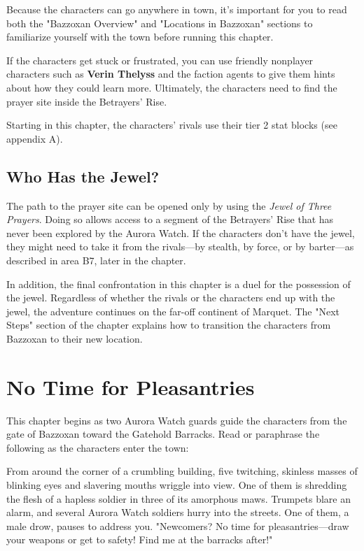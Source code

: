 \documentclass[10pt,a4paper,twoside,bg=print,twocolumn,openany,nodeprecatedcode]{dndbook}
\begin{document}
Because the characters can go anywhere in town, it's important for you to read both the "Bazzoxan Overview" and "Locations in Bazzoxan" sections to familiarize yourself with the town before running this chapter.

If the characters get stuck or frustrated, you can use friendly nonplayer characters such as \textbf{Verin Thelyss} and the faction agents to give them hints about how they could learn more. Ultimately, the characters need to find the prayer site inside the Betrayers' Rise.

Starting in this chapter, the characters' rivals use their tier 2 stat blocks (see appendix A).

\subsection{Who Has the Jewel?}
The path to the prayer site can be opened only by using the \textit{Jewel of Three Prayers}. Doing so allows access to a segment of the Betrayers' Rise that has never been explored by the Aurora Watch. If the characters don't have the jewel, they might need to take it from the rivals—by stealth, by force, or by barter—as described in area B7, later in the chapter.

In addition, the final confrontation in this chapter is a duel for the possession of the jewel. Regardless of whether the rivals or the characters end up with the jewel, the adventure continues on the far-off continent of Marquet. The "Next Steps" section of the chapter explains how to transition the characters from Bazzoxan to their new location.

\section{No Time for Pleasantries}
This chapter begins as two Aurora Watch guards guide the characters from the gate of Bazzoxan toward the Gatehold Barracks. Read or paraphrase the following as the characters enter the town:

\begin{DndReadAloud}{}
From around the corner of a crumbling building, five twitching, skinless masses of blinking eyes and slavering mouths wriggle into view. One of them is shredding the flesh of a hapless soldier in three of its amorphous maws. Trumpets blare an alarm, and several Aurora Watch soldiers hurry into the streets. One of them, a male drow, pauses to address you. "Newcomers? No time for pleasantries—draw your weapons or get to safety! Find me at the barracks after!"

\end{DndReadAloud}
\end{document}
